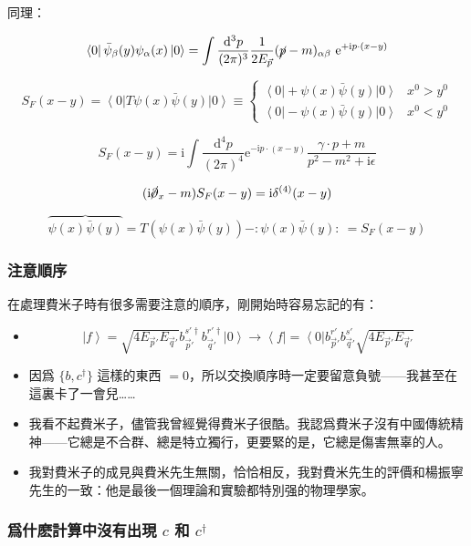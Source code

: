 \documentclass{article}
\begin{document}
同理：

$$\left\langle0\right|\bar{\psi}_{\beta}(y)\psi_{\alpha}(x)\left|0\right\rangle=\int\frac{\mathrm{d}^3p}{(2\pi)^3}\frac{1}{2E_{\vec{p}}}(\cancel{p}-m)_{\alpha\beta}\ \mathrm{e}^{+\mathrm{i}p\cdot(x-y)}$$

$$
S_F(x-y)=\left\langle0\right|T\psi(x)\bar{\psi}(y)\left|0\right\rangle\equiv
\begin{cases}
\left\langle0\right|+\psi(x)\bar{\psi}(y)\left|0\right\rangle & x^0>y^0 \\ \left\langle0\right|-\psi(x)\bar{\psi}(y)\left|0\right\rangle & x^0<y^0
\end{cases}
$$

$$
S_F(x-y)=\mathrm{i}\int\frac{\mathrm{d}^4p}{(2\pi)^4}\mathrm{e}^{-\mathrm{i}p\cdot(x-y)}\frac{\gamma\cdot p+m}{p^2-m^2+\mathrm{i}\epsilon}
$$

$$
(\mathrm{i}\cancel{\partial}_x-m)S_F(x-y)=\mathrm{i}\delta^{(4)}(x-y)
$$

$$
\overbrace{\psi(x)\bar\psi(y)}=T(\psi(x)\bar\psi(y))-:\psi(x)\bar\psi(y):\ =S_F(x-y)
$$

\subsubsection{注意順序}

在處理費米子時有很多需要注意的順序，剛開始時容易忘記的有：

\begin{itemize}
\item $$\left|f\right\rangle=\sqrt{4E_{\vec{p}'}E_{\vec{q}'}}b_{\vec{p}'}^{s'\dagger}b_{\vec{q}'}^{r'\dagger}\left|0\right\rangle\to\left\langle f\right|=\left\langle 0\right|b_{\vec{p}'}^{r'}b_{\vec{q}'}^{s'}\sqrt{4E_{\vec{p}'}E_{\vec{q}'}}
  $$
\item 因爲 $\{b,c^{\dagger}\}$ 這樣的東西 $=0$，所以交換順序時一定要留意負號——我甚至在這裏卡了一會兒……
\item 我看不起費米子，儘管我曾經覺得費米子很酷。我認爲費米子沒有中國傳統精神——它總是不合群、總是特立獨行，更要緊的是，它總是傷害無辜的人。
\item 我對費米子的成見與費米先生無關，恰恰相反，我對費米先生的評價和楊振寧先生的一致：他是最後一個理論和實驗都特別强的物理學家。
\end{itemize}

\subsubsection{爲什麽計算中沒有出現 $c$ 和 $c^{\dagger}$}
\end{document}
